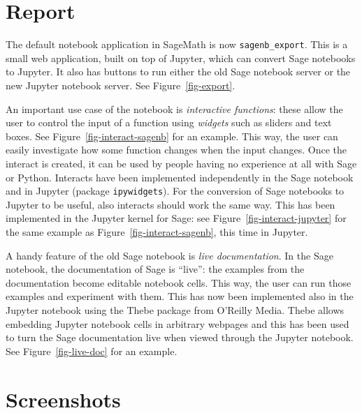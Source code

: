 \documentclass{deliverablereport}
\author{Florent Cayr\'e, Jeroen Demeyer, Nicolas M. Thi\'ery}
\begin{document}
\maketitle
\githubissuedescription
\tableofcontents

\section{Report}
The default notebook application in SageMath is now \texttt{sagenb\_export}.
This is a small web application, built on top of Jupyter,
which can convert Sage notebooks to Jupyter.
It also has buttons to run either the
old Sage notebook server or the new Jupyter notebook server.
See Figure~\ref{fig-export}.

An important use case of the notebook is \emph{interactive functions}:
these allow the user to control the input of a function
using \emph{widgets} such as sliders and text boxes.
See Figure~\ref{fig-interact-sagenb} for an example.
This way, the user can easily investigate how some function changes
when the input changes.
Once the interact is created, it can be used by people having no experience
at all with Sage or Python.
Interacts have been implemented independently in the Sage notebook
and in Jupyter (package \texttt{ipywidgets}).
For the conversion of Sage notebooks to Jupyter to be useful,
also interacts should work the same way.
This has been implemented in the Jupyter kernel for Sage:
see Figure~\ref{fig-interact-jupyter} for the same example as
Figure~\ref{fig-interact-sagenb}, this time in Jupyter.

A handy feature of the old Sage notebook is \emph{live documentation}.
In the Sage notebook, the documentation of Sage is ``live'':
the examples from the documentation become editable notebook cells.
This way, the user can run those examples and experiment with them.
This has now been implemented also in the Jupyter notebook using
the Thebe package from O'Reilly Media.
Thebe allows embedding Jupyter notebook cells in arbitrary webpages
and this has been used to turn the Sage documentation live when viewed
through the Jupyter notebook.
See Figure~\ref{fig-live-doc} for an example.


\appendix
\section{Screenshots}
\newcommand{\screenshot}[2]{
\begin{figure}[ht]
  \texttt{[image: \#1]}
  \caption{#2}
\end{figure}}
\end{document}
